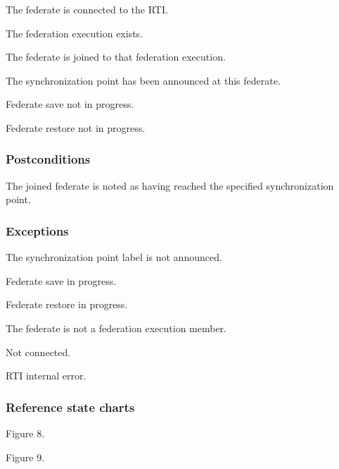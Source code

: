 \begin{stdalphalist}
    \item The federate is connected to the RTI.
    \item The federation execution exists.
    \item The federate is joined to that federation execution.
    \item The synchronization point has been announced at this federate.
    \item Federate save not in progress.
    \item Federate restore not in progress.
\end{stdalphalist}

\subsubsection{Postconditions}

\begin{stdalphalist}
    \item The joined federate is noted as having reached the specified synchronization point.
\end{stdalphalist}

\subsubsection{Exceptions}

\begin{stdalphalist}
    \item The synchronization point label is not announced.
    \item Federate save in progress.
    \item Federate restore in progress.
    \item The federate is not a federation execution member.
    \item Not connected.
    \item RTI internal error.
\end{stdalphalist}

\subsubsection{Reference state charts}

\begin{stdalphalist}
    \item Figure 8.
    \item Figure 9.
\end{stdalphalist}

